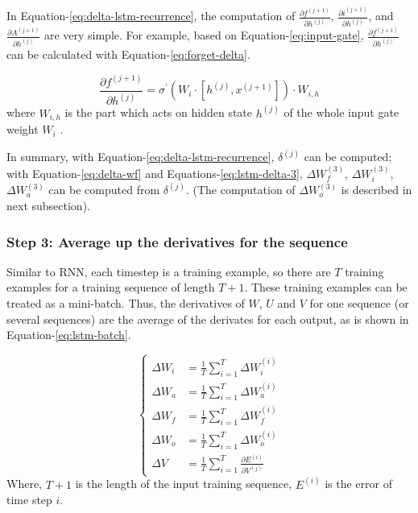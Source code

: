 \documentclass[english]{article}
\begin{document}
In Equation-\ref{eq:delta-lstm-recurrence}, the computation of $\frac{\partial f^{(j+1)}}{\partial h^{(j)}}$, $\frac{\partial i^{(j+1)}}{\partial h^{(j)}}$, and 
$\frac{\partial A^{(j+1)}}{\partial h^{(j)}}$ are very simple. For example, based on Equation-\ref{eq:input-gate}, 
$\frac{\partial f^{(j+1)}}{\partial h^{(j)}}$ can be calculated with Equation-\ref{eq:forget-delta}.

\begin{equation}\label{eq:forget-delta}
     \frac{\partial f^{(j+1)}}{\partial h^{(j)}} = \sigma^{\prime}(W_i \cdot [h^{(j)}, x^{(j+1)}]) \cdot W_{i,h}
\end{equation}
where $W_{i,h}$ is the part which acts on hidden state $h^{(j)}$ of the whole input gate weight $W_i$ .

In summary, with Equation-\ref{eq:delta-lstm-recurrence},  $\delta^{(j)}$ can be computed; 
with Equation-\ref{eq:delta-wf} and Equations-\ref{eq:lstm-delta-3},  $\Delta W^{(3)}_f$,  $\Delta W^{(3)}_i$, $\Delta W^{(3)}_a$ can be computed from $\delta^{(j)}$. (The computation of $\Delta W^{(3)}_o$ is described in next subsection).

\subsubsection{Step 3: Average up the derivatives for the sequence}
Similar to RNN, each timestep is a training example, so there are $T$ training examples for a training sequence of length $T+1$.
These training examples can be treated as a mini-batch.  Thus, the derivatives of $W$, $U$ and $V$ for one sequence (or several sequences) are the
average of the derivates for each output, as is shown in Equation-\ref{eq:lstm-batch}.
 
 \begin{equation}\label{eq:lstm-batch}\begin{cases}
\Delta W_i &=  \frac{1}{T}\sum\limits_{i=1}^T\Delta W^{(i)}_i\\
\Delta W_a&=  \frac{1}{T}\sum\limits_{i=1}^T\Delta W^{(i)}_a\\
\Delta W_f &=  \frac{1}{T}\sum\limits_{i=1}^T\Delta W^{(i)}_f\\
\Delta W_o &=  \frac{1}{T}\sum\limits_{i=1}^T\Delta W^{(i)}_o\\
\Delta V &=  \frac{1}{T}\sum\limits_{i=1}^T\frac{\partial E^{(i)}}{\partial V^{(j)}}
\end{cases}\end{equation}
Where, $T+1$ is the length of the input training sequence, $E^{(i)}$ is the error of time step $i$.
 
\end{document}
